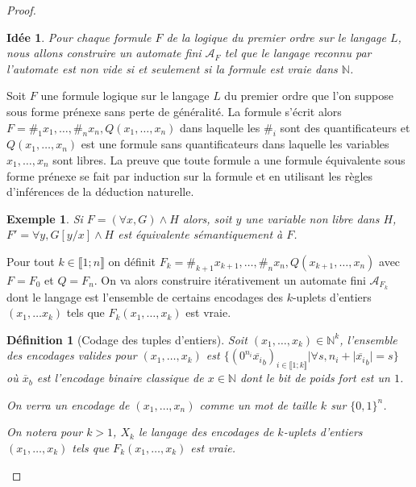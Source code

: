 \documentclass[12pt]{article}
\theoremstyle{break}
\newtheorem*{idea*}{Idée}
\newtheorem*{example*}{Exemple}
\newtheorem*{definition*}{Définition}
\begin{document}
\begin{proof}
  \begin{idea*}
    Pour chaque formule $F$ de la logique du premier ordre sur le langage $L$, nous allons construire un automate fini $\mathcal{A}_F$ tel que le langage reconnu par l'automate est non vide si et seulement si la formule est vraie dans $\mathbb{N}$.
  \end{idea*}

  Soit $F$ une formule logique sur le langage $L$ du premier ordre que l'on suppose sous forme prénexe sans perte de généralité. La formule s'écrit alors $F=\#_1x_1, \ldots, \#_nx_n, Q(x_1, \ldots, x_n)$ dans laquelle les $\#_i$ sont des quantificateurs et $Q(x_1, \ldots, x_n)$ est une formule sans quantificateurs dans laquelle les variables $x_1, \ldots, x_n$ sont libres. La preuve que toute formule a une formule équivalente sous forme prénexe se fait par induction sur la formule et en utilisant les règles d'inférences de la déduction naturelle.

  \begin{example*}
    Si $F = (\forall x, G) \land H$ alors, soit $y$ une variable non libre dans $H$, $F' = \forall y, G[y/x] \land H$ est équivalente sémantiquement à $F$.
  \end{example*}
  
  Pour tout $k \in \llbracket 1; n\rrbracket$ on définit $F_k = \#_{k+1}x_{k+1}, \ldots, \#_nx_n, Q(x_{k+1}, \ldots, x_n)$ avec $F=F_0$ et $Q=F_n$. On va alors construire itérativement un automate fini $\mathcal{A}_{F_k}$ dont le langage est l'ensemble de certains encodages des $k$-uplets d'entiers $(x_1, \ldots x_k)$ tels que $F_k(x_1, \ldots, x_k)$ est vraie.

  
  \begin{definition*}[Codage des tuples d'entiers]
    Soit $(x_1, \ldots, x_k) \in \mathbb{N}^k$, l'ensemble des encodages valides pour $(x_1, \ldots, x_k)$ est $\{(0^{n_i}\overline{x_i}_b)_{i \in \llbracket 1; k \rrbracket} | \forall s, n_i + |\overline{x_i}_b| = s\}$ o\`u $\overline{x}_b$ est l'encodage binaire classique de $x \in \mathbb{N}$ dont le bit de poids fort est un $1$.

    \noindent
    On verra un encodage de $(x_1, \ldots, x_n)$ comme un mot de taille $k$ sur $\{0, 1\}^n$.

    \noindent
    On notera pour $k>1$, $X_k$ le langage des encodages de $k$-uplets d'entiers $(x_1, \ldots, x_k)$ tels que $F_k(x_1, \ldots, x_k)$ est vraie.
  \end{definition*}


\end{proof}
\end{document}
